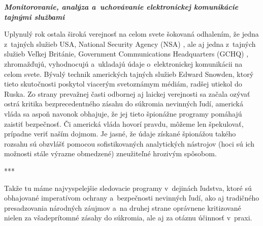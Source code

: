 \documentclass{article}
\begin{document}
\pagebreak

\begin{center}
\Huge
\textbf{\textit{Monitorovanie, analýza a~uchovávanie elektronickej komunikácie tajnými službami}}
\normalsize
\end{center}

\bigskip

Uplynulý rok ostala široká verejnosť na celom svete šokovaná odhalením, že jedna z~tajných služieb USA, National Security Agency (NSA) \cite{nsa}, ale aj jedna z~tajných služieb Veľkej Británie, Government Communications Headquarters (GCHQ) \cite{gchq}, zhromažďujú, vyhodnocujú a~ukladajú údaje o~elektronickej komunikácii na celom svete. Bývalý technik amerických tajných služieb Edward Snowden, ktorý tieto skutočnosti poskytol viacerým svetoznámym médiám, radšej utiekol do Ruska. \cite{techsme1,sme1} Zo strany prevažnej časti odbornej aj laickej verejnosti sa začala ozývať ostrá kritika bezprecedentného zásahu do súkromia nevinných ľudí, americká vláda sa aspoň navonok obhajuje, že jej tieto špionážne programy pomáhajú zaistiť bezpečnosť. Či americká vláda hovorí pravdu, môžeme len špekulovať, prípadne veriť naším dojmom. Je jasné, že údaje získané špionážou takého rozsahu sú obzvlášť pomocou sofistikovaných analytických nástrojov (hoci sú ich možnosti stále výrazne obmedzené) zneužiteľné hrozivým spôsobom.

\begin{center}
***
\end{center}

Takže tu máme najvyspelejšie sledovacie programy v~dejinách ľudstva, ktoré sú obhajované imperatívom ochrany a~bezpečnosti nevinných ľudí, ako aj tradičného presadzovania národných záujmov a~na druhej strane oprávnene kritizované nielen za všadeprítomné zásahy do súkromia, ale aj za otáznu účinnosť v~praxi.

\smallskip
\end{document}
